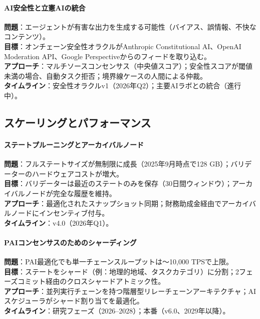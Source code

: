 \documentclass[11pt]{article}
\begin{document}
\paragraph{AI安全性と立憲AIの統合}
\textbf{問題}：エージェントが有害な出力を生成する可能性（バイアス、誤情報、不快なコンテンツ）。\\
\textbf{目標}：オンチェーン安全性オラクルがAnthropic Constitutional AI、OpenAI Moderation API、Google Perspectiveからのフィードを取り込む。\\
\textbf{アプローチ}：マルチソースコンセンサス（中央値スコア）；安全性スコアが閾値未満の場合、自動タスク拒否；境界線ケースの人間による仲裁。\\
\textbf{タイムライン}：安全性オラクルv1（2026年Q2）；主要AIラボとの統合（進行中）。

\subsection{スケーリングとパフォーマンス}

\paragraph{ステートプルーニングとアーカイバルノード}
\textbf{問題}：フルステートサイズが無制限に成長（2025年9月時点で128 GB）；バリデーターのハードウェアコストが増大。\\
\textbf{目標}：バリデーターは最近のステートのみを保存（30日間ウィンドウ）；アーカイバルノードが完全な履歴を維持。\\
\textbf{アプローチ}：最適化されたスナップショット同期；財務助成金経由でアーカイバルノードにインセンティブ付与。\\
\textbf{タイムライン}：v4.0（2026年Q1）。

\paragraph{PAIコンセンサスのためのシャーディング}
\textbf{問題}：PAI最適化でも単一チェーンスループットは〜10,000 TPSで上限。\\
\textbf{目標}：ステートをシャード（例：地理的地域、タスクカテゴリ）に分割；2フェーズコミット経由のクロスシャードアトミック性。\\
\textbf{アプローチ}：並列実行チェーンを持つ階層型リレーチェーンアーキテクチャ；AIスケジューラがシャード割り当てを最適化。\\
\textbf{タイムライン}：研究フェーズ（2026--2028）；本番（v6.0、2029年以降）。
\end{document}
